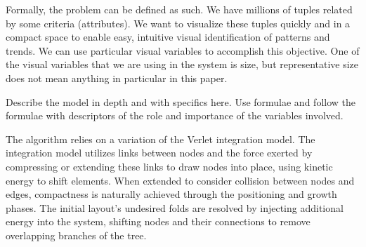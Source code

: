 Formally, the problem can be defined as such. We have millions of tuples related by some criteria (attributes). We want to visualize these 
tuples quickly and in a compact space to enable easy, intuitive visual identification of patterns and trends. We can use particular visual variables to accomplish this objective. One of the visual variables that we are using in the system is size, but representative size does not mean anything in particular in this paper.

Describe the model in depth and with specifics here. Use formulae and follow the formulae with descriptors of the role and importance of the variables involved.

The algorithm relies on a variation of the Verlet integration model. The integration model utilizes links between nodes and the force exerted by compressing or extending these links to draw nodes into place, using kinetic energy to shift elements. When extended to consider collision between nodes and edges, compactness is naturally achieved through the positioning and growth phases. The initial layout's undesired folds are resolved by injecting additional energy into the system, shifting nodes and their connections to remove overlapping branches of the tree.

